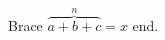 \documentclass[12pt]{article}
\begin{document}
Brace $\overbrace{a+b+c}^{n} = x$ end.
\end{document}
